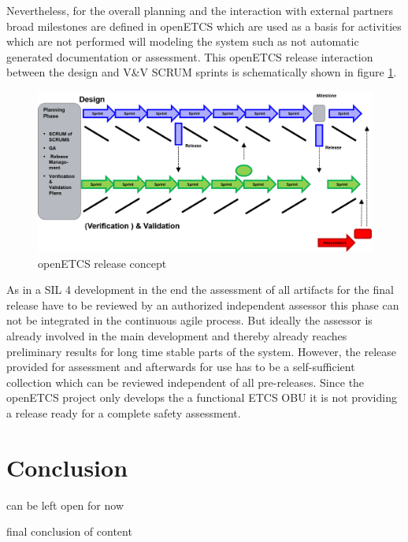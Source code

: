 Nevertheless, for the overall planning and the interaction with external partners broad milestones are defined in openETCS which are used as a basis for activities which are not performed will modeling the system such as not automatic generated documentation or assessment. This openETCS release interaction between the design and V\&V SCRUM sprints is schematically shown in figure \ref{fig:openETCSReleases}.

\begin{figure}[hbt]
\centering
\includegraphics[width=0.95\linewidth]{./images/openETCS_release-concept}
\caption{openETCS release concept}
\label{fig:openETCSReleases}
\end{figure}

As in a SIL 4 development in the end the assessment of all artifacts for the final release have to be reviewed by an authorized independent assessor this phase can not be integrated in the continuous agile process. But ideally the assessor is already involved in the main development and thereby already reaches  preliminary results for long time stable parts of the system. However, the release provided for assessment and afterwards for use has to be a self-sufficient collection which can be reviewed independent of all pre-releases. Since the openETCS project only develops the a functional ETCS OBU it is not providing a release ready for a complete safety assessment. 


\chapter{Conclusion}
\label{sec:conclusion}

can be left open for now

final conclusion of content 


%







